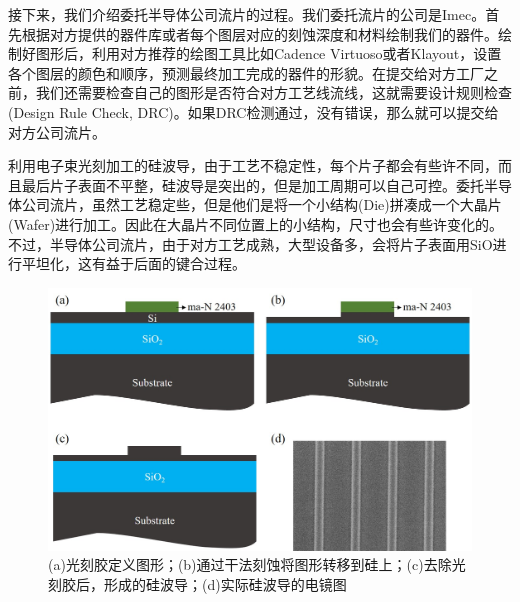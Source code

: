 接下来，我们介绍委托半导体公司流片的过程。我们委托流片的公司是Imec\cite{Imec}。首先根据对方提供的器件库或者每个图层对应的刻蚀深度和材料绘制我们的器件。绘制好图形后，利用对方推荐的绘图工具比如Cadence Virtuoso或者Klayout，设置各个图层的颜色和顺序，预测最终加工完成的器件的形貌。在提交给对方工厂之前，我们还需要检查自己的图形是否符合对方工艺线流线，这就需要设计规则检查(Design Rule Check, DRC)。如果DRC检测通过，没有错误，那么就可以提交给对方公司流片。

利用电子束光刻加工的硅波导，由于工艺不稳定性，每个片子都会有些许不同，而且最后片子表面不平整，硅波导是突出的，但是加工周期可以自己可控。委托半导体公司流片，虽然工艺稳定些，但是他们是将一个小结构(Die)拼凑成一个大晶片(Wafer)进行加工。因此在大晶片不同位置上的小结构，尺寸也会有些许变化的。不过，半导体公司流片，由于对方工艺成熟，大型设备多，会将片子表面用SiO进行平坦化，这有益于后面的键合过程。

\begin{figure}[htb]
	\centering
	\includegraphics[width=14cm]{./Pictures/chapt4_3D_etch_siwg.jpg}
	\caption{(a)光刻胶定义图形；(b)通过干法刻蚀将图形转移到硅上；(c)去除光刻胶后，形成的硅波导；(d)实际硅波导的电镜图}
	\label{chapt4_3D_etch_siwg}
\end{figure}

